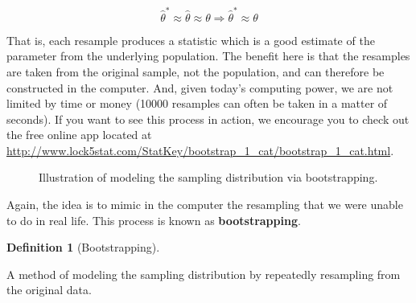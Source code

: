 \documentclass[
  letterpaper,
  DIV=11,
  numbers=noendperiod]{scrreprt}
\theoremstyle{definition}
\newtheorem{definition}{Definition}[chapter]
\theoremstyle{definition}
\theoremstyle{plain}
\theoremstyle{remark}
\begin{document}
\[
\widehat{\theta}^* \approx \widehat{\theta} \approx \theta \Rightarrow \widehat{\theta}^* \approx \theta
\]

That is, each resample produces a statistic which is a good estimate of
the parameter from the underlying population. The benefit here is that
the resamples are taken from the original sample, not the population,
and can therefore be constructed in the computer. And, given today's
computing power, we are not limited by time or money (10000 resamples
can often be taken in a matter of seconds). If you want to see this
process in action, we encourage you to check out the free online app
located at
\url{http://www.lock5stat.com/StatKey/bootstrap_1_cat/bootstrap_1_cat.html}.

\begin{figure}


\caption{\label{fig-samplingdistns-bootstrap}Illustration of modeling
the sampling distribution via bootstrapping.}

\end{figure}%

Again, the idea is to mimic in the computer the resampling that we were
unable to do in real life. This process is known as
\textbf{bootstrapping}.

\begin{definition}[Bootstrapping]\protect\hypertarget{def-bootstrap}{}\label{def-bootstrap}

A method of modeling the sampling distribution by repeatedly resampling
from the original data.

\end{definition}
\end{document}
